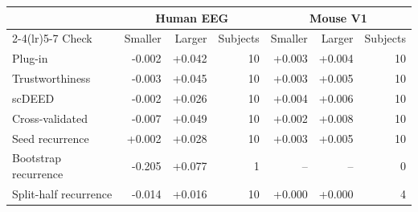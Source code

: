 \begin{tabular}{lrrrrrr}
\toprule
 & \multicolumn{3}{c}{Human EEG} & \multicolumn{3}{c}{Mouse V1} \\
\cmidrule(lr){2-4}\cmidrule(lr){5-7}
Check & Smaller & Larger & Subjects & Smaller & Larger & Subjects \\
\midrule
Plug-in & -0.002 & +0.042 & 10 & +0.003 & +0.004 & 10 \\
Trustworthiness & -0.003 & +0.045 & 10 & +0.003 & +0.005 & 10 \\
scDEED & -0.002 & +0.026 & 10 & +0.004 & +0.006 & 10 \\
Cross-validated & -0.007 & +0.049 & 10 & +0.002 & +0.008 & 10 \\
Seed recurrence & +0.002 & +0.028 & 10 & +0.003 & +0.005 & 10 \\
Bootstrap recurrence & -0.205 & +0.077 & 1 & -- & -- & 0 \\
Split-half recurrence & -0.014 & +0.016 & 10 & +0.000 & +0.000 & 4 \\
\bottomrule
\end{tabular}
